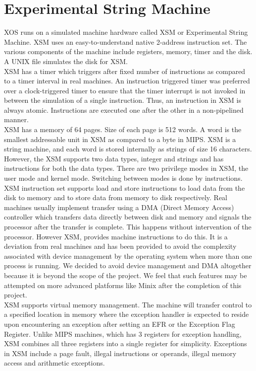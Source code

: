 \documentclass[10pt]{report}
\begin{document}
\section{Experimental String Machine }
XOS runs on a simulated machine hardware called XSM or Experimental String Machine. XSM uses an easy-to-understand native 2-address instruction set. The various components of the machine include registers, memory, timer and the disk. A UNIX file simulates the disk for XSM.\\

XSM has a timer which triggers after fixed number of instructions as compared to a timer interval in real machines. An instruction triggered timer was preferred over a clock-triggered timer to ensure that the timer interrupt is not invoked in between the simulation of a single instruction. Thus, an instruction in XSM is always atomic. Instructions are executed one after the other in a non-pipelined manner.\\

XSM has a memory of 64 pages. Size of each page is 512 words. A word is the smallest addressable unit in XSM as compared to a byte in MIPS. XSM is a string machine, and each word is stored internally as strings of size 16 characters.  However, the XSM supports two data types, integer and strings and has instructions for both  the data types. There are two privilege modes in XSM, the user mode and kernel mode. Switching between modes is done by instructions.\\

XSM instruction set supports load and store instructions to load data from the disk to memory and to store data from memory to disk respectively. Real machines usually implement transfer using a DMA (Direct Memory Access) controller which transfers data directly between disk and memory and signals the processor after the transfer is complete. This happens without intervention of the processor. However XSM, provides machine instructions to do this. It is a deviation from real machines and has been provided to avoid the complexity associated with device management by the operating system when more than one process is running. We decided to avoid device management and DMA altogether because it is beyond the scope of the project. We feel that such features may be attempted on more advanced platforms like Minix after the completion of this project. \\

XSM supports virtual memory management. The machine will transfer control to a specified location in memory where the exception handler is expected to reside upon encountering an exception after setting an EFR or the Exception Flag Register. Unlike MIPS machines\cite{mips}, which has 3 registers for exception handling, XSM combines all three registers into a single register for simplicity. Exceptions in XSM include a page fault, illegal instructions or operands, illegal memory access and arithmetic exceptions. \\
\end{document}
